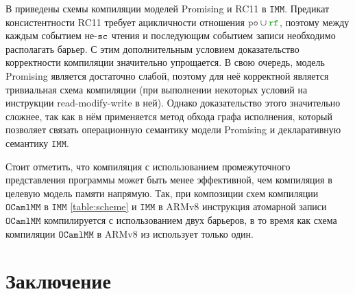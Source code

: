 \documentclass[14pt]{matmex-diploma-custom}
\newcommand{\IMM}{\mathtt{IMM}}
\newcommand{\OMM}{\mathtt{OCaml}\allowbreak \mathtt{MM}}
\begin{document}
В \cite{imm} приведены схемы компиляции моделей  Promising \cite{promising} и RC11 \cite{rc11} в $\IMM$. Предикат консистентности RC11 требует ацикличности отношения $\lPO \cup \lRF$, поэтому между каждым событием не-${\mathtt{sc}}$ чтения и последующим событием записи необходимо располагать барьер. С этим дополнительным условием доказательство корректности компиляции значительно упрощается. В свою очередь, модель Promising является достаточно слабой, поэтому для неё корректной является тривиальная схема компиляции (при выполнении некоторых условий на инструкции read-modify-write в ней). Однако доказательство этого значительно сложнее, так как в нём применяется метод обхода графа исполнения, который позволяет связать операционную семантику модели Promising и декларативную семантику $\IMM$.

Стоит отметить, что компиляция с использованием промежуточного представления программы может быть менее эффективной, чем компиляция в целевую модель памяти напрямую. Так, при композиции схем компиляции $\OMM$ в $\IMM$ \ref{table:scheme} и $\IMM$ в ARMv8 \cite{imm-sc} инструкция атомарной записи $\OMM$ компилируется с использованием двух барьеров, в то время как схема компиляции $\OMM$ в ARMv8 из \cite{omm} использует только один. 

\section{Заключение}
\label{future-work}


\end{document}
